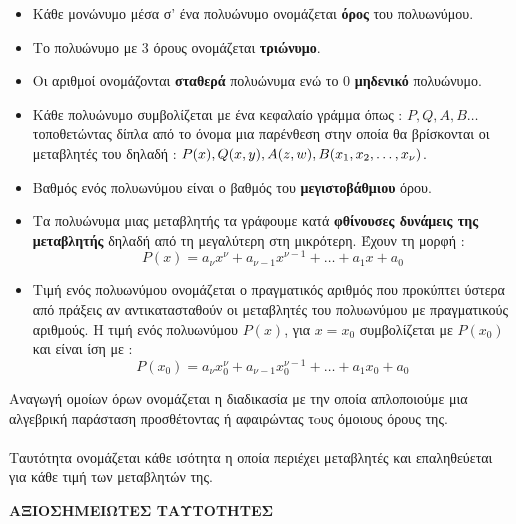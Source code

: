 \documentclass[twoside,nofonts,internet,shmeiwseis]{thewria}
\begin{document}
\begin{itemize}[itemsep=0mm]
\item Κάθε μονώνυμο μέσα σ' ένα πολυώνυμο ονομάζεται \textbf{όρος} του πολυωνύμου.
\item Το πολυώνυμο με 3 όρους ονομάζεται \textbf{τριώνυμο}.
\item Οι αριθμοί ονομάζονται \textbf{σταθερά} πολυώνυμα ενώ το 0 \textbf{μηδενικό} πολυώνυμο.
\item  Κάθε πολυώνυμο συμβολίζεται με ένα κεφαλαίο γράμμα όπως : $ P, Q, A, B\ldots $ τοποθετώντας δίπλα από το όνομα μια παρένθεση στην οποία θα βρίσκονται οι μεταβλητές του δηλαδή : $ P(x), Q(x,y), A(z,w), \\B(x_1,x_2,\ldots,x_\nu) $.
\item Βαθμός ενός πολυωνύμου είναι ο βαθμός του \textbf{μεγιστοβάθμιου} όρου.
\item Τα πολυώνυμα μιας μεταβλητής τα γράφουμε κατά \textbf{φθίνουσες δυνάμεις της μεταβλητής} δηλαδή από τη μεγαλύτερη στη μικρότερη. Έχουν τη μορφή :
\[ P(x)=a_\nu x^\nu+a_{\nu-1}x^{\nu-1}+\ldots+a_1x+a_0 \]
\item Τιμή ενός πολυωνύμου ονομάζεται ο πραγματικός αριθμός που προκύπτει ύστερα από πράξεις αν αντικατασταθούν οι μεταβλητές του πολυωνύμου με πραγματικούς αριθμούς. Η τιμή ενός πολυωνύμου $ P(x) $,  για $ x=x_0 $ συμβολίζεται με $ P(x_0) $ και είναι ίση με :
\[ P(x_0)=a_\nu x_0^\nu+a_{\nu-1}x_0^{\nu-1}+\ldots+a_1x_0+a_0 \]
\end{itemize}
Αναγωγή ομοίων όρων ονομάζεται η διαδικασία με την οποία απλοποιούμε μια αλγεβρική παράσταση προσθέτοντας ή αφαιρώντας τoυς όμοιους όρους της.\\\\
Ταυτότητα ονομάζεται κάθε ισότητα η οποία περιέχει μεταβλητές και επαληθεύεται για κάθε τιμή των μεταβλητών της.
\begin{center}
\textbf{ΑΞΙΟΣΗΜΕΙΩΤΕΣ ΤΑΥΤΟΤΗΤΕΣ}
\end{center}
\end{document}
